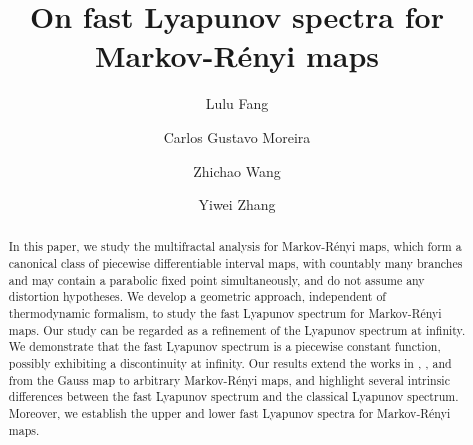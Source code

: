 \documentclass[12pt,reqno]{amsart}
\renewcommand{\=}{\coloneqq}
\theoremstyle{plain}
\begin{document}
\title[]{On fast Lyapunov spectra for Markov-R\'{e}nyi maps}

\author{Lulu Fang}

\author{Carlos Gustavo Moreira}

\author{Zhichao Wang}


\author{Yiwei Zhang}




\begin{abstract}
  In this paper, we study the multifractal analysis for Markov-R\'{e}nyi maps, which form a canonical class of piecewise differentiable interval maps, with countably many branches and may contain a parabolic fixed point simultaneously, and do not assume any distortion hypotheses. We develop a geometric approach, independent of thermodynamic formalism, to study the fast Lyapunov spectrum for Markov-R\'{e}nyi maps. Our study can be regarded as a refinement of the Lyapunov spectrum at infinity. We demonstrate that the fast Lyapunov spectrum is a piecewise constant function, possibly exhibiting a discontinuity at infinity. Our results extend the works in \cite[Theorem 1.1]{FLWW13}, \cite[Theorem 1.2]{LR}, and \cite[Theorem 1.2]{FSW} from the Gauss map to arbitrary Markov-R\'{e}nyi maps, and highlight several intrinsic differences between the fast Lyapunov spectrum and the classical Lyapunov spectrum. Moreover, we establish the upper and lower fast Lyapunov spectra for Markov-R\'{e}nyi maps.

\end{abstract}

\maketitle
\end{document}

